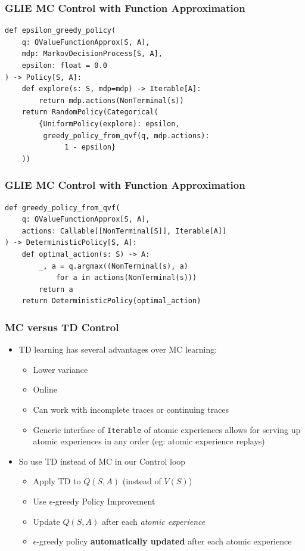 \documentclass[handout]{beamer}
\begin{document}
\begin{frame}[fragile]
\frametitle{GLIE MC Control with Function Approximation}
\pause
\begin{lstlisting}    
def epsilon_greedy_policy(
    q: QValueFunctionApprox[S, A],
    mdp: MarkovDecisionProcess[S, A],
    epsilon: float = 0.0
) -> Policy[S, A]:
    def explore(s: S, mdp=mdp) -> Iterable[A]:
        return mdp.actions(NonTerminal(s))
    return RandomPolicy(Categorical(
        {UniformPolicy(explore): epsilon,
         greedy_policy_from_qvf(q, mdp.actions):
              1 - epsilon}
    ))
\end{lstlisting}
\end{frame}
    
\begin{frame}[fragile]
\frametitle{GLIE MC Control with Function Approximation}
\pause
\begin{lstlisting}
def greedy_policy_from_qvf(
    q: QValueFunctionApprox[S, A],
    actions: Callable[[NonTerminal[S]], Iterable[A]]
) -> DeterministicPolicy[S, A]:
    def optimal_action(s: S) -> A:
        _, a = q.argmax((NonTerminal(s), a)
            for a in actions(NonTerminal(s)))
        return a
    return DeterministicPolicy(optimal_action)
\end{lstlisting}    
\end{frame}




\begin{frame}
\frametitle{MC versus TD Control}
\pause
\begin{itemize}[<+->]
\item TD learning has several advantages over MC learning:
\begin{itemize}[<+->]
\item Lower variance
\item Online
\item Can work with incomplete traces or continuing traces
\item Generic interface of \lstinline{Iterable} of atomic experiences allows for serving up atomic experiences in any order (eg: atomic experience replays)
\end{itemize}
\pause
\item So use TD instead of MC in our Control loop
\pause
\begin{itemize}[<+->]
\item Apply TD to $Q(S,A)$ (instead of $V(S)$)
\item Use $\epsilon$-greedy Policy Improvement
\item Update $Q(S,A)$ after each {\em atomic experience}
\item $\epsilon$-greedy policy {\bf automatically updated} after each atomic experience
\end{itemize}
\end{itemize}
\end{frame}
\end{document}
